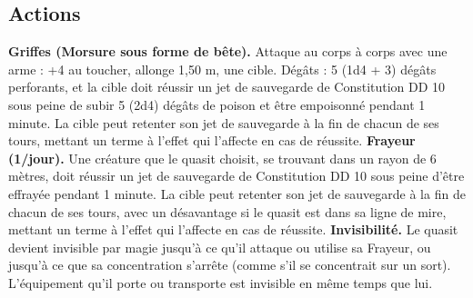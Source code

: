 \begin{figure*}[hb!]
{\begin{minipage}[c]{.45\linewidth}
    \subsection*{Actions}
    {\bfseries Griffes (Morsure sous forme de bête).} Attaque au corps à corps avec une arme : +4 au toucher, allonge 1,50 m, une cible. Dégâts : 5 (1d4 + 3) dégâts perforants, et la cible doit réussir un jet de sauvegarde de Constitution DD 10 sous peine de subir 5 (2d4) dégâts de poison et être empoisonné pendant 1 minute. La cible peut retenter son jet de sauvegarde à la fin de chacun de ses tours, mettant un terme à l'effet qui l'affecte en cas de réussite.
    {\bfseries Frayeur (1/jour).} Une créature que le quasit choisit, se trouvant dans un rayon de 6 mètres, doit réussir un jet de sauvegarde de Constitution DD 10 sous peine d'être effrayée pendant 1 minute. La cible peut retenter son jet de sauvegarde à la fin de chacun de ses tours, avec un désavantage si le quasit est dans sa ligne de mire, mettant un terme à l'effet qui l'affecte en cas de réussite.
    {\bfseries Invisibilité.} Le quasit devient invisible par magie jusqu'à ce qu'il attaque ou utilise sa Frayeur, ou jusqu'à ce que sa concentration s'arrête (comme s'il se concentrait sur un sort). L'équipement qu'il porte ou transporte est invisible en même temps que lui.
  \end{minipage}
}%
\end{figure*}

